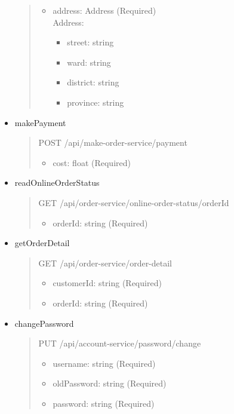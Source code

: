 \begin{itemize}
\begin{quote}
		      \begin{itemize}
			      \item address: Address (Required)\\
			            Address:
			            \begin{itemize}
				            \item street: string
				            \item ward: string
				            \item district: string
				            \item province: string
			            \end{itemize}
		      \end{itemize}
	      \end{quote}
	\item makePayment
	      \begin{quote}
		      POST /api/make-order-service/payment
		      \begin{itemize}
			      \item cost: float (Required)
		      \end{itemize}
	      \end{quote}

	\item readOnlineOrderStatus
	      \begin{quote}
		      GET /api/order-service/online-order-status/{orderId}
		      \begin{itemize}
			      \item orderId: string (Required)
		      \end{itemize}
	      \end{quote}

	\item getOrderDetail
	      \begin{quote}
		      GET /api/order-service/order-detail
		      \begin{itemize}
			      \item customerId: string (Required)
			      \item orderId: string (Required)
		      \end{itemize}
	      \end{quote}
\end{itemize}

\begin{itemize}
	\item changePassword
	      \begin{quote}
		      PUT /api/account-service/password/change
		      \begin{itemize}
			      \item username: string (Required)
			      \item oldPassword: string (Required)
			      \item password: string (Required)
		      \end{itemize}
	      \end{quote}
\end{itemize}





